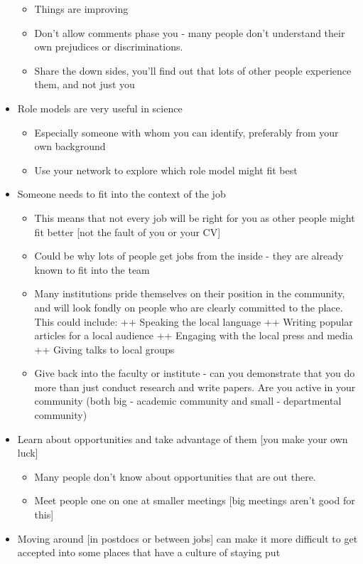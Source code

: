 \documentclass[
]{krantz}
\providecommand{\tightlist}{%
  \setlength{\itemsep}{0pt}\setlength{\parskip}{0pt}}
\begin{document}
\begin{itemize}
  \begin{itemize}
  \tightlist
  \item
    Things are improving
  \item
    Don't allow comments phase you - many people don't understand their own prejudices or discriminations.
  \item
    Share the down sides, you'll find out that lots of other people experience them, and not just you
  \end{itemize}
\item
  Role models are very useful in science

  \begin{itemize}
  \tightlist
  \item
    Especially someone with whom you can identify, preferably from your own background
  \item
    Use your network to explore which role model might fit best
  \end{itemize}
\item
  Someone needs to fit into the context of the job

  \begin{itemize}
  \tightlist
  \item
    This means that not every job will be right for you as other people might fit better {[}not the fault of you or your CV{]}
  \item
    Could be why lots of people get jobs from the inside - they are already known to fit into the team
  \item
    Many institutions pride themselves on their position in the community, and will look fondly on people who are clearly committed to the place. This could include:
    ++ Speaking the local language
    ++ Writing popular articles for a local audience
    ++ Engaging with the local press and media
    ++ Giving talks to local groups
  \item
    Give back into the faculty or institute - can you demonstrate that you do more than just conduct research and write papers. Are you active in your community (both big - academic community and small - departmental community)
  \end{itemize}
\item
  Learn about opportunities and take advantage of them {[}you make your own luck{]}

  \begin{itemize}
  \tightlist
  \item
    Many people don't know about opportunities that are out there.
  \item
    Meet people one on one at smaller meetings {[}big meetings aren't good for this{]}
  \end{itemize}
\item
  Moving around {[}in postdocs or between jobs{]} can make it more difficult to get accepted into some places that have a culture of staying put


\end{itemize}
\end{document}
